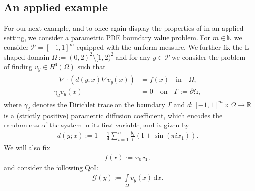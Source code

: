 \documentclass{article}
\newcommand{\cG}{\mathcal{G}}
\newcommand{\cP}{\mathcal{P}}
\newcommand{\IN}{\mathbb{N}}
\newcommand{\IR}{\mathbb{R}}
\renewcommand{\d}{{\text{d}}}
\newcommand{\dx}{{\d x}}
\theoremstyle{definition}
\begin{document}
\subsection{An applied example}
For our next example, and to once again display the properties of  in an applied setting, we consider a parametric PDE boundary value problem. For $m \in \IN$ we consider $\cP = [-1,1]^m$ equipped with the uniform measure. We further fix the L-shaped domain $\Omega:=(0,2)^2\setminus [1,2)^2$ and for any $y \in \cP$ we consider the problem of finding $v_y \in H^1(\Omega)$ such that
\begin{align}
  \label{eq:pde}
  \begin{aligned}
    -\nabla\cdot(d(y;x)\nabla v_y (x)) &= f(x)\quad\text{in}\quad\Omega,\\
    \gamma_d v_y(x) &= 0\quad\text{on}\quad\Gamma:=\partial\Omega,
  \end{aligned}
\end{align}
where $\gamma_d$ denotes the Dirichlet trace on the boundary $\Gamma$
and $d:[-1,1]^m\times\Omega\to\IR$ is a (strictly positive) parametric diffusion coefficient, which encodes
the randomness of the system in its first variable, and is given by
\begin{align*}
  d(y;x):=1+\frac{1}{4}\sum\limits_{i=1}^n\frac{y_i}{i}\left(1+\sin(\pi ix_1)\right).
\end{align*}
We will also fix
\begin{align*}
  f(x):=x_0x_1,
\end{align*} 
and consider the following QoI:
\begin{align*}
  \cG(y):=\int\limits_{\Omega} v_y(x)\,\dx.
\end{align*}
\end{document}
